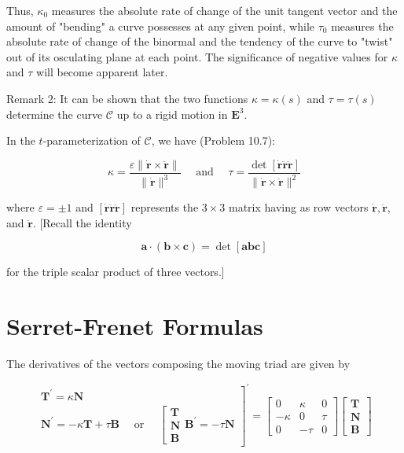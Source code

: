 \documentclass[10pt]{article}
\begin{document}
Thus, $\kappa_{0}$ measures the absolute rate of change of the unit tangent vector and the amount of "bending" a curve possesses at any given point, while $\tau_{0}$ measures the absolute rate of change of the binormal and the tendency of the curve to "twist" out of its osculating plane at each point. The significance of negative values for $\kappa$ and $\tau$ will become apparent later.

Remark 2: It can be shown that the two functions $\kappa=\kappa(s)$ and $\tau=\tau(s)$ determine the curve $\mathscr{C}$ up to a rigid motion in $\mathbf{E}^{3}$.

In the $t$-parameterization of $\mathscr{C}$, we have (Problem 10.7):


\begin{equation*}
\kappa=\frac{\varepsilon\|\dot{\mathbf{r}} \times \ddot{\mathbf{r}}\|}{\|\dot{\mathbf{r}}\|^{3}} \quad \text { and } \quad \tau=\frac{\operatorname{det}[\dot{\mathbf{r}} \ddot{\mathbf{r}} \ddot{\mathbf{r}}]}{\|\dot{\mathbf{r}} \times \ddot{\mathbf{r}}\|^{2}} \tag{10.8}
\end{equation*}


where $\varepsilon= \pm 1$ and $[\dot{\mathbf{r}} \ddot{\mathbf{r}} \ddot{\mathbf{r}}]$ represents the $3 \times 3$ matrix having as row vectors $\dot{\mathbf{r}}, \ddot{\mathbf{r}}$, and $\ddot{\mathbf{r}}$. [Recall the identity

$$
\mathbf{a} \cdot(\mathbf{b} \times \mathbf{c})=\operatorname{det}[\mathbf{a} \mathbf{b} \mathbf{c}]
$$

for the triple scalar product of three vectors.]

\section*{Serret-Frenet Formulas}
The derivatives of the vectors composing the moving triad are given by

\[
\left.\begin{array}{l}
\mathbf{T}^{\prime}=\kappa \mathbf{N}  \tag{10.9}\\
\mathbf{N}^{\prime}=-\kappa \mathbf{T}+\tau \mathbf{B} \quad \text { or } \quad\left[\begin{array}{l}
\mathbf{T} \\
\mathbf{N} \\
\mathbf{B}
\end{array} \mathbf{B}^{\prime}=-\tau \mathbf{N}\right.
\end{array}\right]^{\prime}=\left[\begin{array}{rrr}
0 & \kappa & 0 \\
-\kappa & 0 & \tau \\
0 & -\tau & 0
\end{array}\right]\left[\begin{array}{l}
\mathbf{T} \\
\mathbf{N} \\
\mathbf{B}
\end{array}\right]
\]
\end{document}
